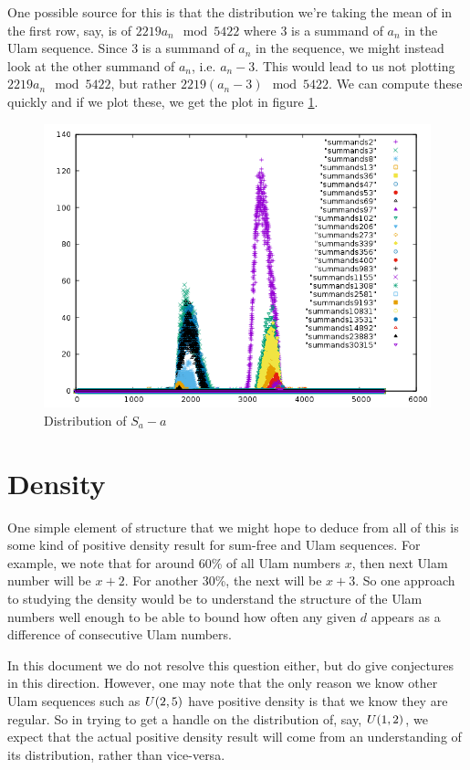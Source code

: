 \documentclass{report}
\theoremstyle{remark}
\numberwithin{equation}{section}
\begin{document}
One possible source for this is that the distribution we're taking the
mean of in the first row, say, is of $2219 a_n \mod{5422}$ where 3 is
a summand of $a_n$ in the Ulam sequence.  Since 3 is a summand of
$a_n$ in the sequence, we might instead look at the other summand of
$a_n$, i.e. $a_n - 3$.  This would lead to us not plotting
$2219a_n \mod {5422}$, but rather $2219(a_n-3) \mod{5422}$.  We can
compute these quickly and if we plot these, we get the plot in figure
\ref{fig:complements}.

\begin{figure}
\caption{Distribution of $S_a - a$}\label{fig:complements}
\centering
\includegraphics[scale=0.5]{../figs/shifted_summands_mod_5422.png}
\end{figure}

\section{Density}

One simple element of structure that we might hope to deduce from all
of this is some kind of positive density result for sum-free and Ulam
sequences.  For example, we note that for around 60\% of all Ulam
numbers $x$, then next Ulam number will be $x+2$.  For another 30\%,
the next will be $x+3$.  So one approach to studying the density would
be to understand the structure of the Ulam numbers well enough to be
able to bound how often any given $d$ appears as a difference of
consecutive Ulam numbers.

In this document we do not resolve this question either, but do give
conjectures in this direction.  However, one may note that the only
reason we know other Ulam sequences such as $U(2,5)$ have
positive density is that we know they are regular.  So in trying to
get a handle on the distribution of, say, $U(1,2)$, we expect
that the actual positive density result will come from an
understanding of its distribution, rather than vice-versa.
\end{document}
